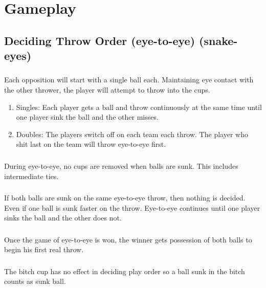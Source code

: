 \section{Gameplay}\label{sec:Gameplay}

    \subsection{Deciding Throw Order (eye-to-eye) (snake-eyes)}\label{ssec:Order}
		\subsubsection{}\label{sssec:Order,ete1}
			Each opposition will start with a single ball each. Maintaining eye contact with the other thrower, the player will attempt to throw into the cups. 
            \begin{enumerate}[label=(\alph*), leftmargin=2cm]%
                \itemsep -1.25em 
                \item Singles: Each player gets a ball and throw continuously at the same time until one player sink the ball and the other misses.\\
                \item Doubles: 	The players switch off on each team each throw. The player who shit last on the team will throw eye-to-eye first.
            \end{enumerate}
		\subsubsection{}\label{sssec:Order,ete_remove}
			During eye-to-eye, no cups are removed when balls are sunk. This includes intermediate ties.
		\subsubsection{}\label{sssec:Order,ete_ties}
			If both balls are sunk on the same eye-to-eye throw, then nothing is decided.
            Even if one ball is sunk faster on the throw. Eye-to-eye continues until one player sinks the ball and the other does not.
		\subsubsection{}\label{sssec:order,ete_2ball}
			Once the game of eye-to-eye is won, the winner gets possession of both balls to begin his first real throw.
        \subsubsection{}\label{ssec:order,bitchcup}
            The bitch cup has no effect in deciding play order so a ball sunk in the bitch counts as sunk ball.
	
